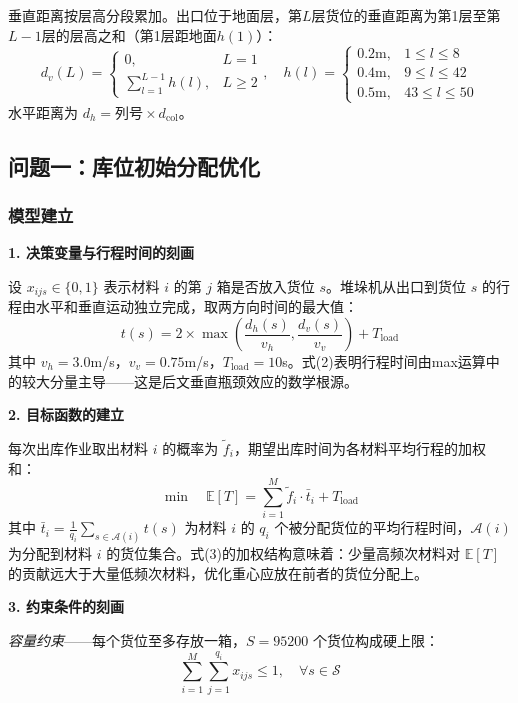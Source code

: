 \documentclass[a4paper]{cumcmthesis}
\newcommand{\E}[1]{\mathbb{E}\left[#1\right]}
\newcommand{\cS}{\mathcal{S}}
\newcommand{\ftilde}{\tilde{f}}
\begin{document}
垂直距离按层高分段累加。出口位于地面层，第$L$层货位的垂直距离为第1层至第$L-1$层的层高之和（第1层距地面$h(1)$）：
\begin{equation}
d_v(L)=\begin{cases}0,&L=1\\\sum_{l=1}^{L-1}h(l),&L\geq 2\end{cases},\quad h(l)=\begin{cases}0.2\text{m},&1\leq l\leq 8\\0.4\text{m},&9\leq l\leq 42\\0.5\text{m},&43\leq l\leq 50\end{cases}
\end{equation}
水平距离为 $d_h=\text{列号}\times d_{\text{col}}$。

\subsection{问题一：库位初始分配优化}

\FloatBarrier\subsubsection{模型建立}

\textbf{1. 决策变量与行程时间的刻画}

设 $x_{ijs}\in\{0,1\}$ 表示材料 $i$ 的第 $j$ 箱是否放入货位 $s$。堆垛机从出口到货位 $s$ 的行程由水平和垂直运动独立完成，取两方向时间的最大值：
\begin{equation}
t(s)=2\times\max\left(\frac{d_h(s)}{v_h},\frac{d_v(s)}{v_v}\right)+T_{\text{load}}
\end{equation}
其中 $v_h=3.0$m/s，$v_v=0.75$m/s，$T_{\text{load}}=10$s。式(2)表明行程时间由max运算中的较大分量主导——这是后文垂直瓶颈效应的数学根源。

\textbf{2. 目标函数的建立}

每次出库作业取出材料 $i$ 的概率为 $\ftilde_i$，期望出库时间为各材料平均行程的加权和：
\begin{equation}
\min\quad \E{T}=\sum_{i=1}^{M}\ftilde_i\cdot\bar{t}_i+T_{\text{load}}
\end{equation}
其中 $\bar{t}_i=\frac{1}{q_i}\sum_{s\in\mathcal{A}(i)}t(s)$ 为材料 $i$ 的 $q_i$ 个被分配货位的平均行程时间，$\mathcal{A}(i)$ 为分配到材料 $i$ 的货位集合。式(3)的加权结构意味着：少量高频次材料对 $\E{T}$ 的贡献远大于大量低频次材料，优化重心应放在前者的货位分配上。

\textbf{3. 约束条件的刻画}

\emph{容量约束}——每个货位至多存放一箱，$S=95200$ 个货位构成硬上限：
\begin{equation}
\sum_{i=1}^{M}\sum_{j=1}^{q_i}x_{ijs}\leq 1,\quad \forall s\in\cS
\end{equation}
\end{document}

